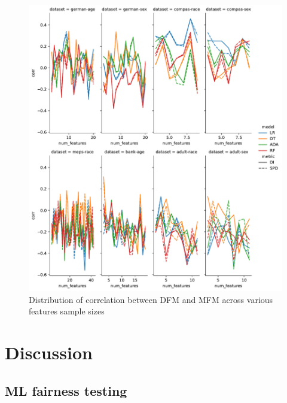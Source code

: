 \documentclass{article}
\begin{document}
\begin{figure}
  \centering
  \includegraphics[width=0.95\linewidth]{lineplot--num-features--corr.pdf}
  \caption{Distribution of correlation between DFM and MFM across
    various features sample sizes}
  \label{fig:lineplot--num-features--corr}
\end{figure}

\section{Discussion}\label{sec:discuss}



\subsection{ML fairness testing}\label{sec:discuss-ml-fair-test}


\end{document}
